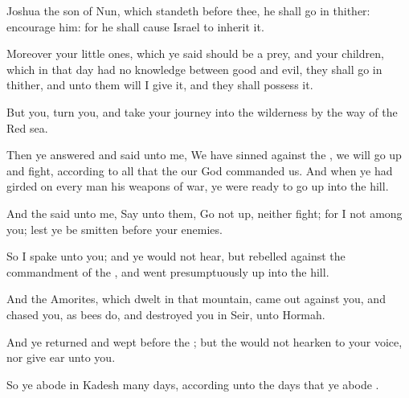 {
Joshua the
son of
Nun, which
standeth
before thee, he shall go
in thither:
encourage him: for he shall cause
Israel to
inherit it.

Moreover your little
ones, which ye
said should be a
prey, and your
children, which in that
day had no
knowledge between
good and
evil, they shall go
in thither, and unto them will I
give it, and they shall
possess it.

But
{} you,
turn you, and take your
journey into the
wilderness by the
way of the
Red
sea.

Then ye
answered and
said unto me, We have
sinned against the
{}, we will go
up and
fight, according to all that the
{} our
God
commanded us. And when ye had
girded on every
man his
weapons of
war, ye were
ready to go
up into the
hill.

And the
{}
said unto me,
Say unto them, Go not
up, neither
fight; for I
{} not
among you; lest ye be
smitten
before your
enemies.

So I
spake unto you; and ye would not
hear, but
rebelled against the
commandment of the
{}, and
went
presumptuously
up into the
hill.

And the
Amorites, which
dwelt in that
mountain, came
out
against you, and
chased you, as
bees
do, and
destroyed you in
Seir,
{} unto
Hormah.

And ye
returned and
wept
before the
{}; but the
{} would not
hearken to your
voice, nor give
ear unto you.

So ye
abode in
Kadesh
many
days, according unto the
days that ye
abode
{}.




\par }
